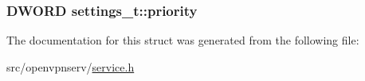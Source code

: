 \subsubsection[{priority}]{\setlength{\rightskip}{0pt plus 5cm}D\+W\+O\+R\+D settings\+\_\+t\+::priority}\label{structsettings__t_ab0aa05b71ae5c8d3ed0b123dd1b830f3}


The documentation for this struct was generated from the following file\+:\begin{DoxyCompactItemize}
\item 
src/openvpnserv/\hyperlink{service_8h}{service.\+h}\end{DoxyCompactItemize}
